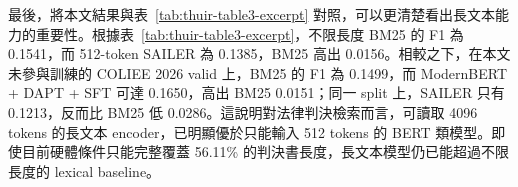 最後，將本文結果與表~\ref{tab:thuir-table3-excerpt} 對照，可以更清楚看出長文本能力的重要性。根據表~\ref{tab:thuir-table3-excerpt}，不限長度 BM25 的 F1 為 0.1541，而 512-token SAILER 為 0.1385，BM25 高出 0.0156。相較之下，在本文未參與訓練的 COLIEE 2026 valid 上，BM25 的 F1 為 0.1499，而 ModernBERT + DAPT + SFT 可達 0.1650，高出 BM25 0.0151；同一 split 上，SAILER 只有 0.1213，反而比 BM25 低 0.0286。這說明對法律判決檢索而言，可讀取 4096 tokens 的長文本 encoder，已明顯優於只能輸入 512 tokens 的 BERT 類模型。即使目前硬體條件只能完整覆蓋 56.11\% 的判決書長度，長文本模型仍已能超過不限長度的 lexical baseline。
